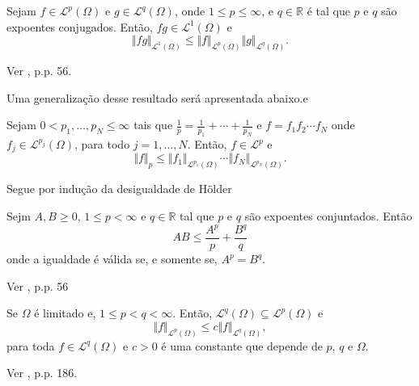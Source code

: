 \documentclass[a4paper, 11pt]{book}
\theoremstyle{definition}
\newcommand{\bR}{\mathbb{R}}
\newcommand{\cL}{\mathcal{L}}
\begin{document}
\begin{tbox} \label{thm:pre-desigualdade-de-holder}
    Sejam $f \in \cL^p(\Omega)$ e $g \in \cL^q(\Omega)$, onde $1 \leqslant p \leqslant \infty$, e $q \in \bR$ é tal que $p$ e $q$ são expoentes conjugados\footnotemark.
    Então, $fg \in \cL^1(\Omega)$ e
    \[
        \Vert fg \Vert_{\cL^1(\Omega)} \leqslant \Vert f \Vert_{\cL^p(\Omega)} \Vert g \Vert_{\cL^q(\Omega)}.
    \]
\end{tbox}
\begin{prf}
    Ver \cite{bartle-measure.theory}, p.p. 56.
\end{prf}


Uma generalização desse resultado será apresentada abaixo.e

\begin{tbox} \label{thm:pre-desigualdade-de-holder-gen}
    Sejam $0 < p_1,\dots,p_N \leqslant \infty$ tais que $\frac{1}{p} = \frac{1}{p_1} + \cdots + \frac{1}{p_N}$ e $f = f_1 f_2 \cdots f_N$ onde $f_j \in \cL^{p_j}(\Omega)$, para todo $j = 1,\dots,N$. 
    Então, $f \in \cL^p$ e 
    \[
        \Vert f \Vert_p \leqslant \Vert f_1 \Vert_{\cL^{p_1}(\Omega)} \cdots \Vert f_N \Vert_{\cL^{p_N}(\Omega)}.
    \] 
\end{tbox}
\begin{prf}
    Segue por indução da desigualdade de Hölder
\end{prf}

\begin{tbox} \label{thm:desigualdade-de-young}
    Sejm $A,B \geqslant 0$, $1 \leqslant p < \infty$ e $q \in \bR$ tal que $p$ e $q$ são expoentes conjuntados. Então
    \[
        AB \leqslant \frac{A^p}{p} + \frac{B^q}{q}
    \]
    onde a igualdade é válida se, e somente se, $A^p = B^q$.
\end{tbox}
\begin{prf}
    Ver \cite{bartle-measure.theory}, p.p. 56
\end{prf}

\begin{tbox} \label{thm:omega-limitado}
    Se $\Omega$ é limitado e, $1 \leqslant p < q < \infty$.
    Então, $\cL^q(\Omega) \subseteq \cL^p(\Omega)$ e 
    \[
        \Vert f \Vert_{\cL^p(\Omega)} \leqslant c \Vert f \Vert_{\cL^q(\Omega)},
    \]
    para toda $f \in \cL^q(\Omega)$ e $c > 0$ é uma constante que depende de $p$, $q$ e $\Omega$.
\end{tbox}
\begin{prf}
    Ver \cite{folland-real.analysis}, p.p. 186.
\end{prf}
\end{document}
